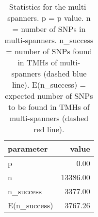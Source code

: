 \begin{table}

\caption{\label{tab:snp_stats_per_spanner_multi}Statistics for the multi-spanners. p = p value. n = number of SNPs in multi-spanners. n_success = number of SNPs found in TMHs of multi-spanners (dashed blue line). E(n_success) = expected number of SNPs to be found in TMHs of multi-spanners  (dashed red line). }
\centering
\begin{tabular}[t]{l|r}
\hline
parameter & value\\
\hline
p & 0.00\\
\hline
n & 13386.00\\
\hline
n\_success & 3377.00\\
\hline
E(n\_success) & 3767.26\\
\hline
\end{tabular}
\end{table}